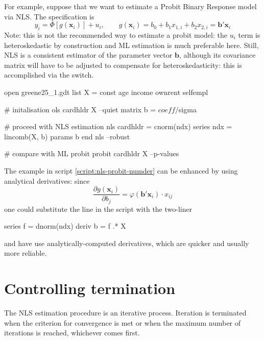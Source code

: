 For example, suppose that we want to estimate a Probit Binary Response
model via NLS. The specification is
\begin{equation}
\label{eq:probit-nls}
y_i = \Phi\left[g(\bm{x}_i)\right] + u_i, \qquad g(\bm{x}_i) = b_0 +
b_1 x_{1,i} + b_2 x_{2,i} = \bm{b}'\bm{x}_i
\end{equation}
Note: this is not the recommended way to estimate a probit model: the
$u_i$ term is heteroskedastic by construction and ML estimation is
much preferable here. Still, NLS is a consistent estimator of the
parameter vector $\bm{b}$, although its covariance matrix will have to
be adjusted to compensate for heteroskedasticity: this is accomplished
via the  switch.

\begin{script}[htbp]
  \label{script:nls-probit-numder}
  \begin{scode}
    open greene25_1.gdt
    list X = const age income ownrent selfempl

    # initalisation
    ols cardhldr X --quiet
    matrix b = $coeff / $sigma

    # proceed with NLS estimation
    nls cardhldr = cnorm(ndx)
        series ndx = lincomb(X, b)
        params b
    end nls --robust

    # compare with ML probit 
    probit cardhldr X --p-values
  \end{scode}
\end{script}

The example in script \ref{script:nls-probit-numder} can be enhanced by
using analytical derivatives: since
\[
\frac{\partial g(\bm{x}_i)}{\partial b_j} = \varphi(\bm{b}'\bm{x}_i) \cdot x_{ij}
\]
one could substitute the  line in the script with the two-liner
\begin{code}
  series f = dnorm(ndx)
  deriv b = {f} .* {X}
\end{code}
and have  use analytically-computed derivatives, which are
quicker and usually more reliable.

\section{Controlling termination}
\label{nls-toler}

The NLS estimation procedure is an iterative process.  Iteration is
terminated when the criterion for convergence is met or when the
maximum number of iterations is reached, whichever comes first.

